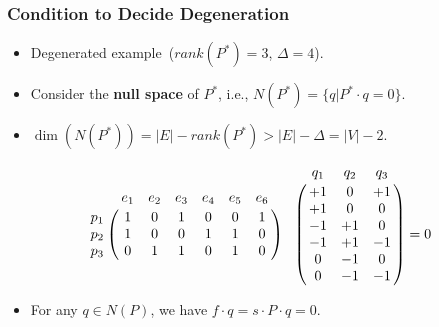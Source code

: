\frame
{
	\frametitle{Condition to Decide Degeneration}
	\begin{itemize}
	\item Degenerated example~($rank(P^*) = 3$, $\Delta = 4$).
	\end{itemize}

	\vspace{0.6cm}
	

	\begin{itemize}
	\item Consider the {\bf null space} of $P^*$, i.e., $N(P^*) = \{q | P^*\cdot q = 0\}$.
	\item $\dim(N(P^*)) = |E| - rank(P^*) > |E| - \Delta = |V| - 2$. 
	\end{itemize}

	\vspace{-0.2cm}

	\begin{displaymath}
	\bordermatrix{
		~   & e_1 & e_2 & e_3 & e_4 & e_5 & e_6\cr
		p_1 & 1 & 0 & 1 & 0 & 0 & 1 \cr
		p_2 & 1 & 0 & 0 & 1 & 1 & 0 \cr
		p_3 & 0 & 1 & 1 & 0 & 1 & 0 \cr
	} 
	\bordermatrix{
   	   ~& q_1 & q_2 & q_3 \cr
		& +1 &  0 & +1  \cr
		& +1 &  0 &  0  \cr
		& -1 & +1 &  0  \cr
		& -1 & +1 & -1  \cr
		&  0 & -1 &  0  \cr
		&  0 & -1 & -1  \cr
	} = 0
	\end{displaymath}

	\begin{itemize}
	\item For any $q\in N(P)$, we have $f\cdot q = s\cdot P \cdot q = 0$. 
	\end{itemize}
}
